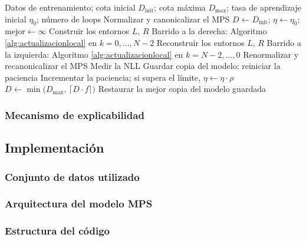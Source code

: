 \documentclass[12pt]{extarticle}
\numberwithin{equation}{section}
\begin{document}
\begin{refsection}
\begin{algorithm}[H]
\caption{Bucle de entrenamiento DMRG}
\label{alg:bucleentrenamiento}
\begin{algorithmic}[1]
\Require Datos de entrenamiento; cota inicial $D_{\text{init}}$; cota máxima $D_{\max}$; tasa de aprendizaje inicial $\eta_0$; número de loops
\State Normalizar y canonicalizar el MPS
\State $D \gets D_{\text{init}}$;\; $\eta \gets \eta_0$;\; $\text{mejor} \gets \infty$
        \State Construir los entornos $L$, $R$
        \State Barrido a la derecha: Algoritmo \ref{alg:actualizacionlocal} en $k = 0, \ldots, N-2$
        \State Reconstruir los entornos $L$, $R$
        \State Barrido a la izquierda: Algoritmo \ref{alg:actualizacionlocal} en $k = N-2, \ldots, 0$
    \EndFor
    \State Renormalizar y recanonicalizar el MPS
    \State Medir la NLL
        \State Guardar copia del modelo;\; reiniciar la paciencia
    \Else
        \State Incrementar la paciencia;\; si supera el límite, $\eta \gets \eta \cdot \rho$
    \EndIf
        \State $D \gets \min\!\big(D_{\max},\, \lceil D \cdot f \rceil\big)$
    \EndIf
\EndFor
\State Restaurar la mejor copia del modelo guardada
\end{algorithmic}
\end{algorithm}

\subsubsection{Mecanismo de explicabilidad}
\label{subsubsec:mecanismoexplicabilidad}

\subsection{Implementaci\'on}

\subsubsection{Conjunto de datos utilizado}
\label{subsubsec:conjuntodatos}

\subsubsection{Arquitectura del modelo MPS}
\label{subsubsec:arquitecturamodelo}

\subsubsection{Estructura del código}
\label{subsubsec:estructuracodigo}


\end{refsection}
\end{document}
